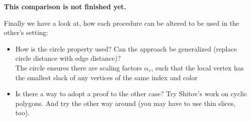 \textbf{This comparison is not finished yet.}

Finally we have a look at, how each procedure can be altered to be used in the other's setting:

\begin{itemize}
  \item How is the circle property used? Can the approach be generalized (replace circle distance with edge distance)?\\
  The circle ensures there are scaling factors $\alpha_v$, such that the local vertex has the smallest slack of any vertices of the same index and color
  \item Is there a way to adopt a proof to the other case? Try Shitov's work on cyclic polygons. And try the other way around (you may have to use thin slices, too).
\end{itemize}

